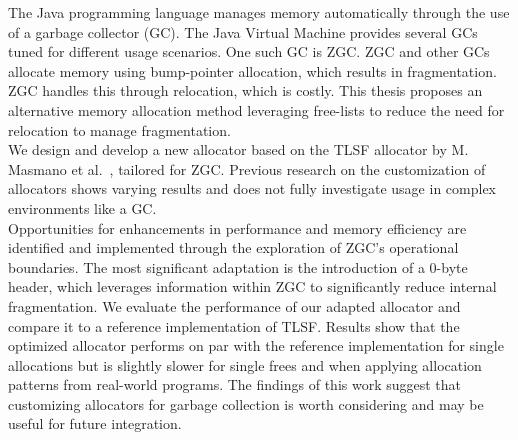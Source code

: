 
The Java programming language manages memory automatically through the use of a garbage collector (GC). The Java Virtual Machine provides several GCs tuned for different usage scenarios. One such GC is ZGC. ZGC and other GCs allocate memory using bump-pointer allocation, which results in fragmentation. ZGC handles this through relocation, which is costly. This thesis proposes an alternative memory allocation method leveraging free-lists to reduce the need for relocation to manage fragmentation.\\

We design and develop a new allocator based on the TLSF allocator by M. Masmano et al.~\cite{TLSF}, tailored for ZGC. Previous research on the customization of allocators shows varying results and does not fully investigate usage in complex environments like a GC.\\

Opportunities for enhancements in performance and memory efficiency are identified and implemented through the exploration of ZGC's operational boundaries. The most significant adaptation is the introduction of a 0-byte header, which leverages information within ZGC to significantly reduce internal fragmentation. We evaluate the performance of our adapted allocator and compare it to a reference implementation of TLSF. Results show that the optimized allocator performs on par with the reference implementation for single allocations but is slightly slower for single frees and when applying allocation patterns from real-world programs. The findings of this work suggest that customizing allocators for garbage collection is worth considering and may be useful for future integration.\\


